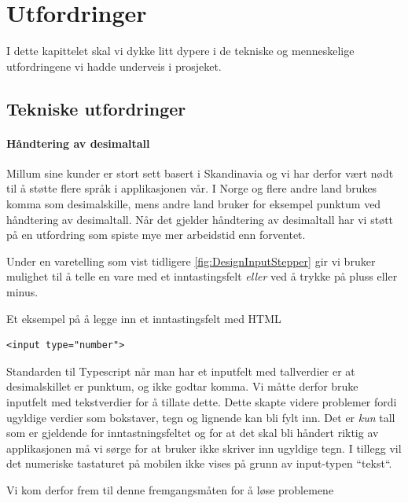 \chapter{\color{Millum}\textbf{Utfordringer}}
 I dette kapittelet skal vi dykke litt dypere i de tekniske og menneskelige utfordringene vi hadde underveis i prosjeket.

\section{\textbf{Tekniske utfordringer}}

\subsubsection{\textbf{Håndtering av desimaltall}}

Millum sine kunder er stort sett basert i Skandinavia og vi har derfor vært nødt til å støtte flere språk i applikasjonen vår. I Norge og flere andre land brukes komma som desimalskille, mens andre land bruker for eksempel punktum ved håndtering av desimaltall. Når det gjelder håndtering av desimaltall har vi støtt på en utfordring som spiste mye mer arbeidstid enn forventet. 

Under en varetelling som vist tidligere \ref{fig:DesignInputStepper} gir vi bruker mulighet til å telle en vare med et inntastingsfelt \textit{eller} ved å trykke på pluss eller minus.

Et eksempel på å legge inn et inntastingsfelt med HTML
\begin{lstlisting}
<input type="number">
\end{lstlisting}

Standarden til Typescript når man har et inputfelt med tallverdier er at desimalskillet er punktum, og ikke godtar komma. Vi måtte derfor bruke inputfelt med tekstverdier for å tillate dette. Dette skapte videre problemer fordi ugyldige verdier som bokstaver, tegn og lignende kan bli fylt inn. Det er \textit{kun} tall som er gjeldende for inntastningsfeltet og for at det skal bli håndert riktig av applikasjonen må vi sørge for at bruker ikke skriver inn ugyldige tegn. I tillegg  vil det numeriske tastaturet på mobilen ikke vises på grunn av input-typen ``tekst``. 

Vi kom derfor frem til denne fremgangsmåten for å løse problemene

